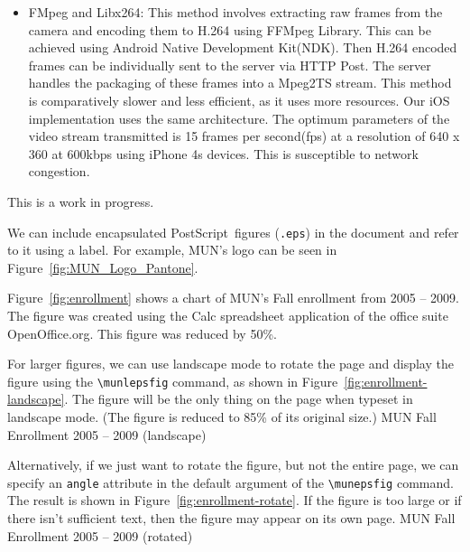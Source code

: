 \begin{itemize}
\begin{itemize}
			\item FMpeg and Libx264: This method involves extracting raw frames from the camera and encoding them to H.264 using FFMpeg Library. This can be achieved using Android Native Development Kit(NDK). Then H.264 encoded frames can be individually sent to the server via HTTP Post. The server handles the packaging of these frames into a Mpeg2TS stream. This method is comparatively slower and less efficient, as it uses more resources. Our iOS implementation uses the same architecture. The optimum parameters of the video stream transmitted is 15 frames per second(fps) at a resolution of 640 x 360 at 600kbps using iPhone 4s devices. This is susceptible to network congestion.		
		\end{itemize}
	This is a work in progress.	
	\end{itemize}





We can include encapsulated PostScript\texttrademark\ figures
(\texttt{.eps}) in the document and refer to it using a label.
For example, MUN's logo can be seen in Figure~\ref{fig:MUN_Logo_Pantone}.

Figure~\ref{fig:enrollment} shows a chart of MUN's Fall
enrollment from 2005 -- 2009.
The figure was created using the \textsf{Calc} spreadsheet application of
the office suite \textsf{OpenOffice.org}.  This figure was reduced by 50\%.

For larger figures, we can use landscape mode to rotate the page
and display the figure using the \verb+\munlepsfig+ command, as shown
in Figure~\ref{fig:enrollment-landscape}.  The figure will be the
only thing on the page when typeset in landscape mode. 
(The figure is reduced to 85\% of its original size.)
	{MUN Fall Enrollment 2005 -- 2009 (landscape)}

Alternatively, if we just want to rotate the figure, but not 
the entire page, we can specify an \texttt{angle} attribute
in the default argument of the \verb+\munepsfig+ command.
The result is shown in Figure~\ref{fig:enrollment-rotate}.
If the figure is too large or if there isn't sufficient
text, then the figure may appear on its own page.
	{MUN Fall Enrollment 2005 -- 2009 (rotated)}

